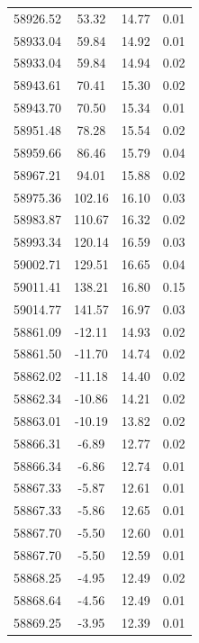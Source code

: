 \begin{longtable}{|c|c|c|c|}
 58926.52 &   53.32 &       14.77 &          0.01 \\
 58933.04 &   59.84 &       14.92 &          0.01 \\
 58933.04 &   59.84 &       14.94 &          0.02 \\
 58943.61 &   70.41 &       15.30 &          0.02 \\
 58943.70 &   70.50 &       15.34 &          0.01 \\
 58951.48 &   78.28 &       15.54 &          0.02 \\
 58959.66 &   86.46 &       15.79 &          0.04 \\
 58967.21 &   94.01 &       15.88 &          0.02 \\
 58975.36 &  102.16 &       16.10 &          0.03 \\
 58983.87 &  110.67 &       16.32 &          0.02 \\
 58993.34 &  120.14 &       16.59 &          0.03 \\
 59002.71 &  129.51 &       16.65 &          0.04 \\
 59011.41 &  138.21 &       16.80 &          0.15 \\
 59014.77 &  141.57 &       16.97 &          0.03 \\
 58861.09 &  -12.11 &       14.93 &          0.02 \\
 58861.50 &  -11.70 &       14.74 &          0.02 \\
 58862.02 &  -11.18 &       14.40 &          0.02 \\
 58862.34 &  -10.86 &       14.21 &          0.02 \\
 58863.01 &  -10.19 &       13.82 &          0.02 \\
 58866.31 &   -6.89 &       12.77 &          0.02 \\
 58866.34 &   -6.86 &       12.74 &          0.01 \\
 58867.33 &   -5.87 &       12.61 &          0.01 \\
 58867.33 &   -5.86 &       12.65 &          0.01 \\
 58867.70 &   -5.50 &       12.60 &          0.01 \\
 58867.70 &   -5.50 &       12.59 &          0.01 \\
 58868.25 &   -4.95 &       12.49 &          0.02 \\
 58868.64 &   -4.56 &       12.49 &          0.01 \\
 58869.25 &   -3.95 &       12.39 &          0.01 \\

\end{longtable}
